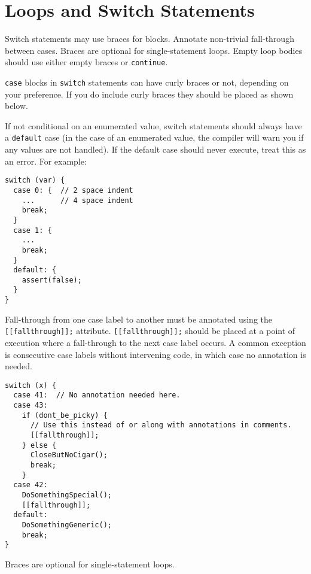 
\section{Loops and Switch Statements}\label{sec:loops-and-switch-statements}
Switch statements may use braces for blocks. Annotate non-trivial fall-through between cases. Braces are optional for single-statement loops. Empty loop bodies should use either empty braces or \texttt{continue}.

\texttt{case} blocks in \texttt{switch} statements can have curly braces or not, depending on your preference. If you do include curly braces they should be placed as shown below.

If not conditional on an enumerated value, switch statements should always have a \texttt{default} case (in the case of an enumerated value, the compiler will warn you if any values are not handled). If the default case should never execute, treat this as an error. For example:

\begin{verbatim}
switch (var) {
  case 0: {  // 2 space indent
    ...      // 4 space indent
    break;
  }
  case 1: {
    ...
    break;
  }
  default: {
    assert(false);
  }
}
\end{verbatim}
Fall-through from one case label to another must be annotated using the \texttt{[[fallthrough]];} attribute. \texttt{[[fallthrough]];} should be placed at a point of execution where a fall-through to the next case label occurs. A common exception is consecutive case labels without intervening code, in which case no annotation is needed.

\begin{verbatim}
switch (x) {
  case 41:  // No annotation needed here.
  case 43:
    if (dont_be_picky) {
      // Use this instead of or along with annotations in comments.
      [[fallthrough]];
    } else {
      CloseButNoCigar();
      break;
    }
  case 42:
    DoSomethingSpecial();
    [[fallthrough]];
  default:
    DoSomethingGeneric();
    break;
}
\end{verbatim}

Braces are optional for single-statement loops.

